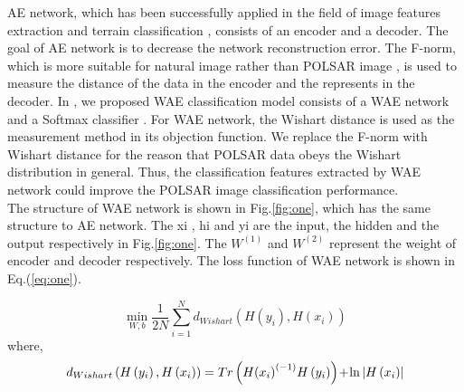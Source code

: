 \documentclass[11pt, a4paper, onecolumn, oneside]{article}
\begin{document}
AE network, which has been successfully applied in the field of image features extraction and terrain classification \cite{w, x}, consists of an encoder and a decoder. The goal of AE network is to decrease the network reconstruction error. The F-norm, which is more suitable for natural image rather than POLSAR image \cite{y}, is used to measure the distance of the data in the encoder and the represents in the decoder. In \cite{c}, we proposed WAE classification model consists of a WAE network and a Softmax classifier \cite{z}. For WAE network, the Wishart distance is used as the measurement method in its objection function. We replace the F-norm with Wishart distance for the reason that POLSAR data obeys the Wishart distribution in general. Thus, the classification features extracted by WAE network could improve the POLSAR image classification performance.\\

The structure of WAE network is shown in Fig.\ref{fig:one}, which has the same structure to AE network. The xi , hi and yi are the input, the hidden and the output respectively in Fig.\ref{fig:one}. The $W^{(1)}$ and $W^{(2)}$ represent the weight of encoder and decoder respectively. The loss function of WAE network is shown in Eq.(\ref{eq:one}).

\begin{equation} \label{eq:one}
\min \limits _{W,b} \frac {1}{2N}\sum \limits _{i = 1}^{N} {{d_{Wishart}}\left ({ {H\left ({ {y_{i}} }\right ),H\left ({ {x_{i}} }\right )} }\right )}
\end{equation}
where,
\begin{equation} 
{d_{Wishart}}\left ({ {H\left ({ {y_{i}} }\right ),H\left ({ {x_{i}} }\right )} }\right ) =Tr\left ({ {H{{\left ({ {x_{i}} }\right )}^{( - 1)}}H\left ({ {y_{i}} }\right )} }\right ) \!+\! \ln \left |{ {H\left ({ {x_{i}} }\right )} }\right | \notag
\end{equation}
\end{document}
